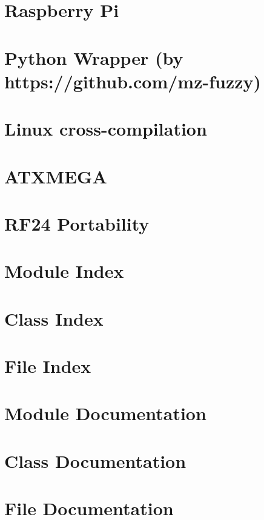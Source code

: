 \documentclass[twoside]{book}
\newcommand{\+}{\discretionary{\mbox{\scriptsize$\hookleftarrow$}}{}{}}
\begin{document}
\chapter{Raspberry Pi}
\label{RPi}

\chapter{Python Wrapper (by https\+://github.com/mz-\/fuzzy)}
\label{Python}

\chapter{Linux cross-\/compilation}
\label{CrossCompile}

\chapter{A\+T\+X\+M\+E\+GA}
\label{ATXMEGA}

\chapter{R\+F24 Portability}
\label{Portability}

\chapter{Module Index}

\chapter{Class Index}

\chapter{File Index}

\chapter{Module Documentation}





\chapter{Class Documentation}

\chapter{File Documentation}














\end{document}
